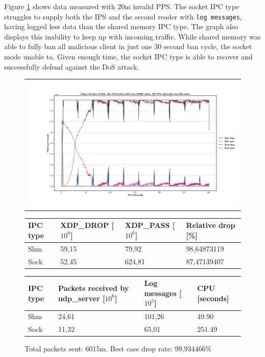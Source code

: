 Figure \ref{fig:data:ipv4v6:20m:131068:2nd} shows data measured with 20m invalid PPS.
The socket IPC type struggles to supply both the IPS and the second reader with \texttt{log messages}, having logged less data than the shared memory IPC type.
The graph also displays this inability to keep up with incoming traffic.
While shared memory was able to fully ban all malicious client in just one 30 second ban cycle, the socket mode unable to.
Given enough time, the socket IPC type is able to recover and successfully defend against the DoS attack.

\begin{figure}[!h]
	\centering
	\scriptsize
	\begin{tabular}{c}
    	\centerline{\includegraphics[width=1.2\textwidth]{images/IPv4v6_20m_2ndReader_1.png}}
	\end{tabular}
	\begin{tabular}{llll}
		\toprule
		\textbf{IPC type} & \textbf{XDP\_DROP [$10^8$]} & \textbf{XDP\_PASS [$10^6$]} & \textbf{Relative drop [\%]} \\ \midrule 
		Shm & 59,15 & 79,92 & 98,64873119 \\
        Sock & 52,45 & 624,81 & 87,47139407 \\
	\bottomrule
	\end{tabular}
    \begin{tabular}{llll}
		\toprule
		\textbf{IPC type} & \textbf{Packets received by udp\_server [$10^6$]} & \textbf{Log messages [$10^5$]} & \textbf{CPU [seconds]} \\ \midrule 
		Shm & 24,61 & 101,26 & 49.90 \\
        Sock & 11,32 & 65,01 & 251.49 \\
	\bottomrule
	\end{tabular}
	\caption[Simplefail2ban with 2nd Reader, IPv4v6, 20m \ac{PPS}, 131068 malicious clients]{Total packets sent: 6015m. Best case drop rate: 99,934466\%}
	\label{fig:data:ipv4v6:20m:131068:2nd}
\end{figure}


